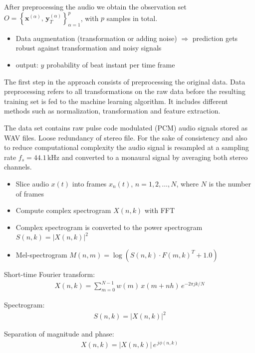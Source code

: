 \documentclass{scrartcl}
\begin{document}
After preprocessing the audio we obtain the observation set $ O = \left\{ \mathbf x^{(\alpha)}, \,\mathbf y_T^{(\alpha)} \right \}_{\alpha = 1}^p$, with $p$ samples in total. 

\begin{itemize}
\item Data augmentation (transformation or adding noise) $\Rightarrow$ prediction gets robust against transformation and noisy signals
\item output: $y$ probability of beat instant per time frame 
\end{itemize}



The first step in the approach consists of preprocessing the original data. Data preprocessing refers to all transformations on the raw data before the resulting training set is fed to the machine learning algorithm. It includes different methods such as normalization, transformation and feature extraction. 

The data set contains raw pulse code modulated (PCM) audio signals stored as WAV files. Loose redundancy of stereo file. For the sake of consistency and also to reduce computational complexity the audio signal is resampled at a sampling rate $f_s = 44.1 \,\text{kHz}$ and converted to a monaural signal by averaging both stereo channels. 


\begin{itemize}
\item Slice audio $x(t)$ into frames $x_n(t)$, $n = 1, 2,\dots, N$, where $N$ is the number of frames
\item Compute complex spectrogram $X(n,k)$ with FFT 
\item Complex spectrogram is converted to the power spectrogram $S(n, k) = |X(n, k)|^2$
\item Mel-spectrogram $M(n,m) = \log \left( S(n,k) \cdot F(m,k)^T + 1.0 \right)$
\end{itemize}
\vspace{1em}

Short-time Fourier transform:
\begin{align}
X(n,k) = \sum_{m = 0}^{N-1} w(m) \, x(m + n  h) \, e^{-2 \pi j  k /N}
\end{align} 

Spectrogram: 
\begin{align}
S(n,k) = |X(n,k)|^2
\end{align} 

Separation of magnitude and phase:
\begin{align} 
X(n,k) = |X(n,k)| \, e^{\, j \phi(n,k)}
\end{align} 
\end{document}
